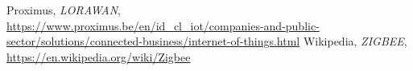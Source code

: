 \documentclass[11pt,a4paper,twoside]{article} %
\begin{document}

\vspace{1.5cm}
			
\begin{thebibliography}{9}
     Proximus, \textit{LORAWAN},\\
	\url{https://www.proximus.be/en/id_cl_iot/companies-and-public-sector/solutions/connected-business/internet-of-things.html}
	 Wikipedia, \textit{ZIGBEE},\\
	\url{https://en.wikipedia.org/wiki/Zigbee}
\end{thebibliography}

	
\end{document}
